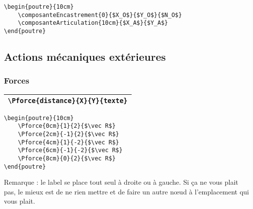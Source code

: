 \documentclass[a4paper,10pt]{article}
\begin{document}
           \begin{verbatim}
\begin{poutre}{10cm}
    \composanteEncastrement{0}{$X_O$}{$Y_O$}{$N_O$}
    \composanteArticulation{10cm}{$X_A$}{$Y_A$}
\end{poutre}
        \end{verbatim}
        
\begin{poutre}{10cm}
\end{poutre}
        
        
        \subsection{Actions mécaniques extérieures}
        
            \subsubsection{Forces}

            \begin{center}
                \begin{tabular}{|l|}
                    \hline
                    \verb!\Pforce{distance}{X}{Y}{texte}!
                    \\\hline
                \end{tabular}
            \end{center}
        
           \begin{verbatim}
\begin{poutre}{10cm}
    \Pforce{0cm}{1}{2}{$\vec R$}
    \Pforce{2cm}{-1}{2}{$\vec R$}
    \Pforce{4cm}{1}{-2}{$\vec R$}
    \Pforce{6cm}{-1}{-2}{$\vec R$}
    \Pforce{8cm}{0}{2}{$\vec R$}
\end{poutre}
        \end{verbatim}
        
\begin{poutre}{10cm}
\end{poutre}
        
        Remarque : le label se place tout seul à droite ou à gauche. Si ça ne vous plait pas, le mieux est de ne rien mettre et de faire un autre n\oe ud à l'emplacement qui vous plait.
	
\end{document}

